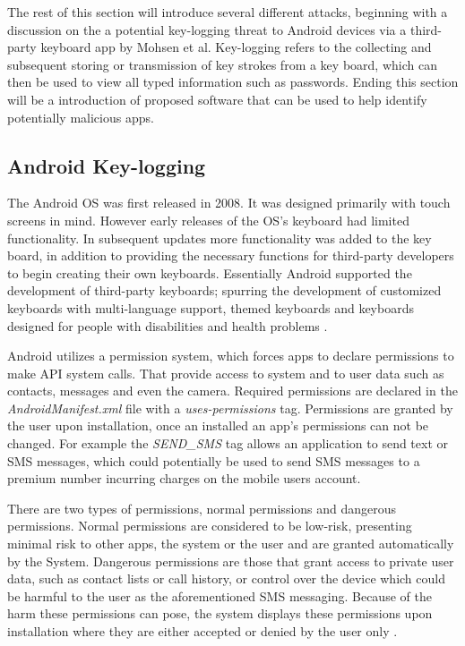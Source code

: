 \documentclass{sig-alternate}
\begin{document}
 
  The rest of this section will introduce several different attacks,  beginning with a discussion on the a potential key-logging threat to Android devices via a third-party keyboard app by Mohsen et al. Key-logging refers to the collecting and subsequent storing or transmission of key strokes from a key board, which can then be used to view all typed information such as passwords. Ending this section will be a introduction of proposed software that can be used to help identify potentially malicious apps. 
  
	\subsection{Android Key-logging}
	\label{app}        
	The Android OS was first released in 2008. It was designed primarily with touch screens in mind. However early releases of the OS's keyboard had limited functionality. In subsequent updates more functionality was added to the key board, in addition to providing the necessary functions for third-party developers to begin creating their own keyboards. Essentially Android supported the development of third-party keyboards; spurring the development of customized keyboards with multi-language support, themed keyboards and keyboards designed for people with disabilities and health problems \cite{Keylogging}.
	
	Android utilizes a permission system, which forces apps to declare permissions to make API system calls. That provide access to system and to user data such as contacts, messages and even the camera. Required permissions are declared in the \textit{AndroidManifest.xml} file with a \textit{uses-permissions} tag. Permissions are granted by the user upon installation, once an installed an app's permissions can not be changed. For example the \textit{SEND\_SMS} tag allows an application to send text or SMS messages, which could potentially be used to send SMS messages to a premium number incurring charges on the mobile users account.
	
	 There are two types of permissions, normal permissions and dangerous permissions. Normal permissions are considered to be low-risk, presenting minimal risk to other apps, the system or the user and are granted automatically by the System. Dangerous permissions are those that grant access to private user data, such as contact lists or call history, or control over the device which could be harmful to the user as the aforementioned SMS messaging. Because of the harm these permissions can pose, the system displays these permissions upon installation where they are either accepted or denied by the user only \cite{Keylogging}.
	 
\end{document}

